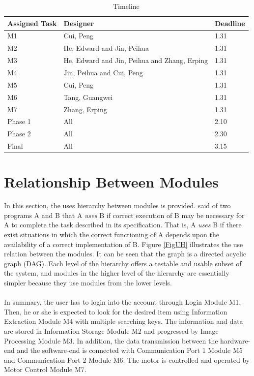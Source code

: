 \documentclass[12pt, titlepage]{article}
\begin{document}
\begin{table}[H]
\begin{tabularx}{\textwidth}{XXX}
  \toprule		
  \textbf{Assigned Task} & \textbf{Designer} & \textbf{Deadline}\\
  \midrule 
  M1 & Cui, Peng & 1.31\\
  M2 & He, Edward and Jin, Peihua & 1.31\\
  M3 & He, Edward and Jin, Peihua and Zhang, Erping & 1.31\\
  M4 & Jin, Peihua and Cui, Peng & 1.31\\
  M5 & Cui, Peng & 1.31\\
  M6 & Tang, Guangwei & 1.31\\
  M7 & Zhang, Erping & 1.31\\
  Phase 1 & All & 2.10\\
  Phase 2 & All & 2.30\\
  Final & All & 3.15\\
  \bottomrule
\end{tabularx}
\caption{Timeline}
\label{TableTL}
\end{table}


\section{Relationship Between Modules} 

In this section, the uses hierarchy between modules is
provided. \citet{Parnas1978} said of two programs A and B that A {\em uses} B if
correct execution of B may be necessary for A to complete the task described in
its specification. That is, A {\em uses} B if there exist situations in which
the correct functioning of A depends upon the availability of a correct
implementation of B.  Figure \ref{FigUH} illustrates the use relation between
the modules. It can be seen that the graph is a directed acyclic graph
(DAG). Each level of the hierarchy offers a testable and usable subset of the
system, and modules in the higher level of the hierarchy are essentially simpler
because they use modules from the lower levels.\\
\\
In summary, the user has to login into the account through Login Module M1. Then, he or she is expected to look for the desired item using Information Extraction Module M4 with multiple searching keys. The information and data are stored in Information Storage Module M2 and progressed by Image Processing Module M3. In addition, the data transmission between the hardware-end and the software-end is connected with Communication Port 1 Module M5 and Communication Port 2 Module M6. The motor is controlled and operated by Motor Control Module M7.
\end{document}
